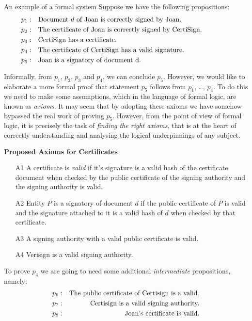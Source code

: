 \begin{example}{An example of a formal system}\label{certificatesex}%
Suppose we have the following propositions:
\begin{eqnarray}\nonumber
\textup{$p_1$}: &&\parbox{10cm}{Document $d$ of Joan is correctly signed by Joan.}\\\nonumber
\textup{$p_2$}:&& \parbox{10cm}{The certificate of Joan is correctly signed by CertiSign.}\\\nonumber
\textup{$p_3$}:&& \parbox{10cm}{CertiSign has a certificate.}\\\nonumber
\textup{$p_4$}:&& \parbox{10cm}{The certificate of CertiSign has a valid signature.}\\\nonumber
\textup{$p_5$}:&& \parbox{10cm}{Joan is a signatory of document d.}
\end{eqnarray}

Informally, from $p_1$, $p_2$, $p_3$ and $p_4$, we can conclude $p_5$. However, we would like to 
elaborate a more formal proof that statement $p_5$ follows from $p_1$, \dots, $p_4$. To do this
we need to make some assumptions, which in the language of formal logic, are known as {\em axioms}.
It may seem that by adopting these axioms we have somehow bypassed the real work of proving $p_5$.
However, from the point of view of formal logic, it is precisely the task of {\em finding the
right axioms}, that is at the heart of correctly understanding and analysing the logical underpinnings of
any subject.

{\bf Proposed Axioms for Certificates}
\begin{itemize}
	\item[A1] A certificate is {\em valid} if it's signature is a valid hash of 
		the certificate document when checked by the public certificate of
		the signing authority and the signing authority is valid.
	\item[A2] Entity $P$ is a signatory of document $d$ if the public certificate of $P$
		is valid and the signature attached to it is a valid hash of $d$ when checked by that certificate.
	\item[A3] A signing authority with a valid public certificate is valid.
	\item[A4] Verisign is a valid signing authority.
\end{itemize}

To prove $p_4$ we are going to need some additional {\em intermediate} propositions, namely:
\begin{eqnarray}
		p_6:&&\hbox{The public certificate of Certisign is a valid.}\nonumber\label{v1}\\
		p_7:&&\hbox{Certisign is a valid signing authority.}\nonumber\label{v1}\\
		p_8:&&\hbox{Joan's certificate is valid.}\nonumber\label{v1}
\end{eqnarray}


\end{example}

